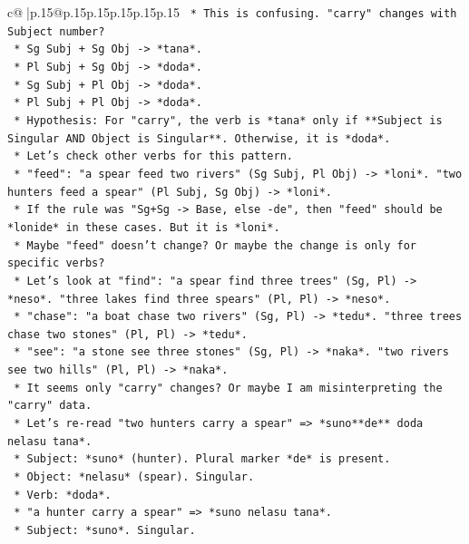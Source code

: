 \documentclass{article}
\begin{document}
{\begin{supertabular}{c@{$\;$}|p{.15\linewidth}@{}p{.15\linewidth}p{.15\linewidth}p{.15\linewidth}p{.15\linewidth}p{.15\linewidth}}
{{{\texttt{        *   This is confusing. "carry" changes with Subject number?} \\
\texttt{            *   Sg Subj + Sg Obj {-}> *tana*.} \\
\texttt{            *   Pl Subj + Sg Obj {-}> *doda*.} \\
\texttt{            *   Sg Subj + Pl Obj {-}> *doda*.} \\
\texttt{            *   Pl Subj + Pl Obj {-}> *doda*.} \\
\texttt{        *   Hypothesis: For "carry", the verb is *tana* only if **Subject is Singular AND Object is Singular**. Otherwise, it is *doda*.} \\
\texttt{    *   Let's check other verbs for this pattern.} \\
\texttt{        *   "feed": "a spear feed two rivers" (Sg Subj, Pl Obj) {-}> *loni*. "two hunters feed a spear" (Pl Subj, Sg Obj) {-}> *loni*.} \\
\texttt{            *   If the rule was "Sg+Sg {-}> Base, else {-}de", then "feed" should be *lonide* in these cases. But it is *loni*.} \\
\texttt{            *   Maybe "feed" doesn't change? Or maybe the change is only for specific verbs?} \\
\texttt{            *   Let's look at "find": "a spear find three trees" (Sg, Pl) {-}> *neso*. "three lakes find three spears" (Pl, Pl) {-}> *neso*.} \\
\texttt{            *   "chase": "a boat chase two rivers" (Sg, Pl) {-}> *tedu*. "three trees chase two stones" (Pl, Pl) {-}> *tedu*.} \\
\texttt{            *   "see": "a stone see three stones" (Sg, Pl) {-}> *naka*. "two rivers see two hills" (Pl, Pl) {-}> *naka*.} \\
\texttt{    *   It seems only "carry" changes? Or maybe I am misinterpreting the "carry" data.} \\
\texttt{    *   Let's re{-}read "two hunters carry a spear" => *suno**de** doda nelasu tana*.} \\
\texttt{        *   Subject: *suno* (hunter). Plural marker *de* is present.} \\
\texttt{        *   Object: *nelasu* (spear). Singular.} \\
\texttt{        *   Verb: *doda*.} \\
\texttt{    *   "a hunter carry a spear" => *suno nelasu tana*.} \\
\texttt{        *   Subject: *suno*. Singular.} \\
}}}
\end{supertabular}}
\end{document}
